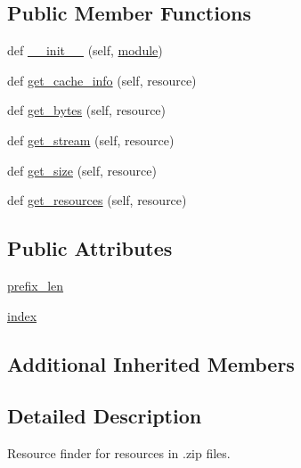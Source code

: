 \subsection*{Public Member Functions}
\begin{DoxyCompactItemize}
\item 
def \hyperlink{classpip_1_1__vendor_1_1distlib_1_1resources_1_1ZipResourceFinder_a5e087e02066ee0bd9278e4d3990e9567}{\+\_\+\+\_\+init\+\_\+\+\_\+} (self, \hyperlink{classpip_1_1__vendor_1_1distlib_1_1resources_1_1ResourceFinder_a9b3f8038afd5558680e180ea2a31a738}{module})
\item 
def \hyperlink{classpip_1_1__vendor_1_1distlib_1_1resources_1_1ZipResourceFinder_a40e6cd7f45e45738dfbbcf6b817a44d9}{get\+\_\+cache\+\_\+info} (self, resource)
\item 
def \hyperlink{classpip_1_1__vendor_1_1distlib_1_1resources_1_1ZipResourceFinder_ad1cdc0084592fab904992c40fe8ff125}{get\+\_\+bytes} (self, resource)
\item 
def \hyperlink{classpip_1_1__vendor_1_1distlib_1_1resources_1_1ZipResourceFinder_a6fda3e2c0568f125d77eeda0aa02e89d}{get\+\_\+stream} (self, resource)
\item 
def \hyperlink{classpip_1_1__vendor_1_1distlib_1_1resources_1_1ZipResourceFinder_a10e52d916b658f52c089cd04936a97b9}{get\+\_\+size} (self, resource)
\item 
def \hyperlink{classpip_1_1__vendor_1_1distlib_1_1resources_1_1ZipResourceFinder_a9835ac6eab9256ba1cadb4c7161db6f2}{get\+\_\+resources} (self, resource)
\end{DoxyCompactItemize}
\subsection*{Public Attributes}
\begin{DoxyCompactItemize}
\item 
\hyperlink{classpip_1_1__vendor_1_1distlib_1_1resources_1_1ZipResourceFinder_a9750de4b476197cebf781f45c96101d6}{prefix\+\_\+len}
\item 
\hyperlink{classpip_1_1__vendor_1_1distlib_1_1resources_1_1ZipResourceFinder_a4b60359a0b035cdb77f0c41c2a2626ec}{index}
\end{DoxyCompactItemize}
\subsection*{Additional Inherited Members}


\subsection{Detailed Description}
\begin{DoxyVerb}Resource finder for resources in .zip files.
\end{DoxyVerb}
 

